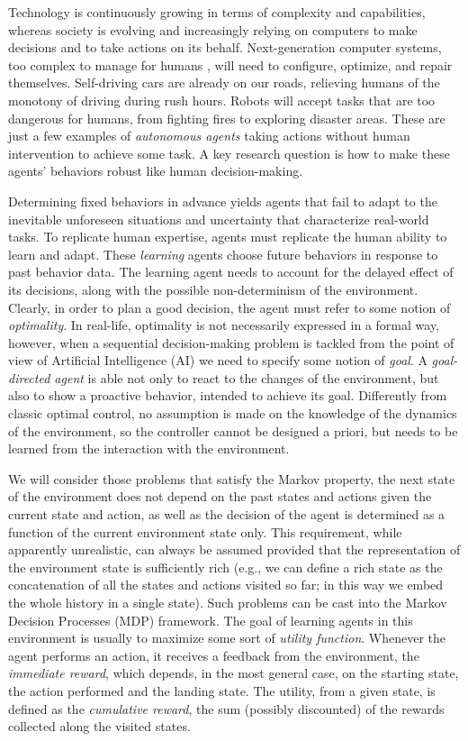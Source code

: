 Technology is continuously growing in terms of complexity and capabilities, whereas society is evolving and increasingly relying on computers to make decisions and to take actions on its behalf. Next-generation computer systems, too complex to manage for humans , will need to configure, optimize, and repair themselves. Self-driving cars are already on our roads, relieving humans of the monotony of driving during rush hours. Robots will accept tasks that are too dangerous for humans, from fighting fires to exploring disaster areas. These are just a few examples of \emph{autonomous agents} taking actions without human intervention to achieve some task. A key research question is how to make these agents’ behaviors robust like human decision-making. \par
Determining fixed behaviors in advance yields agents that fail to adapt to the inevitable unforeseen situations and uncertainty that characterize real-world tasks. To replicate human expertise, agents must replicate the human ability to learn and adapt. These \emph{learning} agents choose future behaviors in response to past behavior data. The learning agent needs to account for the delayed effect of its
decisions, along with the possible non-determinism of the environment. Clearly, in
order to plan a good decision, the agent must refer to some notion of \emph{optimality}. In real-life, optimality is not necessarily expressed in a formal way, however, when
a sequential decision-making problem is tackled from the point of view of Artificial
Intelligence (AI) we need to specify some notion of \emph{goal}. A \emph{goal-directed agent} is able not only to react to the changes of the environment, but also to show a proactive behavior, intended to achieve its goal. Differently from classic optimal control, no assumption is made on the knowledge of the dynamics of the environment, so the controller cannot be designed a priori, but needs to be learned from the interaction with the environment.\par
We will consider those problems that satisfy the Markov property, \ie the next state of the environment does not depend on the past states and actions given the current state and action, as well as the decision of the agent is determined as a function of the current environment state only. This requirement, while apparently unrealistic, can always be assumed provided that the representation of the environment state is
sufficiently rich (e.g., we can define a rich state as the concatenation of all the states and actions visited so far; in this way we embed the whole history in a single state). Such problems can be cast into the Markov Decision Processes (MDP) framework. The goal of learning agents in this environment is usually to maximize some sort of  \emph{utility function}. Whenever the agent performs an action, it receives a feedback from the environment, the \emph{immediate reward}, which depends, in the most general case, on the starting state, the action performed and the landing state. The utility, from a given state, is defined as the \emph{cumulative reward}, \ie the sum (possibly discounted) of the rewards collected along the visited states.\par
